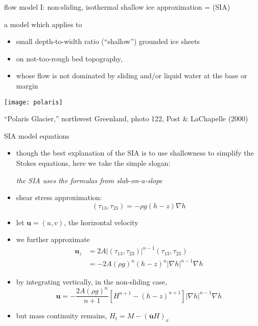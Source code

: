 \begin{frame}{flow model I: non-sliding, isothermal shallow ice approximation = (SIA)}

a model which applies to
\begin{itemize}
\item small depth-to-width ratio (``shallow'') grounded ice sheets
\item on not-too-rough bed topography,
\item whose flow is not dominated by sliding and/or liquid water at the base or margin
\end{itemize}

\begin{center}
  \texttt{[image: polaris]}

\tiny ``Polaris Glacier,'' northwest Greenland, photo 122, Post \& LaChapelle (2000)\nocite{PostLaChapelle}
\end{center}

\end{frame}


\begin{frame}{SIA model equations}

\begin{itemize}
\item \small though the best explanation of the SIA is to use shallowness to simplify the Stokes equations, here we take the simple slogan:\normalsize

\begin{center}
\emph{the SIA uses the formulas from slab-on-a-slope}
\end{center}
\item shear stress approximation:
	$$(\tau_{13},\tau_{23}) = - \rho g (h-z) \nabla h$$
\item let $\mathbf{u} = (u,v)$, the horizontal velocity
\item we further approximate
\begin{align*}
\mathbf{u}_z &= 2 A |(\tau_{13},\tau_{23})|^{n-1} (\tau_{13},\tau_{23}) \\
     &= - 2 A (\rho g)^n (h-z)^n |\nabla h|^{n-1} \nabla h
\end{align*}
\item by integrating vertically, in the non-sliding case,
    $$\mathbf{u} = - \frac{2 A (\rho g)^n}{n+1} \left[H^{n+1} - (h-z)^{n+1}\right] |\nabla h|^{n-1} \nabla h$$
\item but mass continuity remains, $H_t = M - \left(\overline{\mathbf{u}} H\right)_x$
\end{itemize}
\end{frame}


